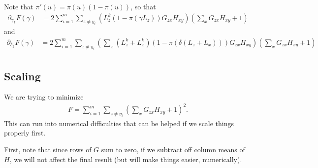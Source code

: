 \documentclass{article}
\begin{document}
Note that $\pi'(u) = \pi(u) (1-\pi(u))$,
so that
\begin{align}
  \partial_{\gamma_k} F(\gamma) &= 2 \sum_{i=1}^m \sum_{z \neq y_i} \left( L^k_z (1-\pi(\gamma L_z)) G_{zx} H_{xy}\right) \left( \sum_x G_{zx} H_{xy} + 1 \right)  
\end{align}
and
\begin{align}
  \partial_{\delta_k} F(\gamma) &= 2 \sum_{i=1}^m \sum_{z \neq y_i} \left( \sum_x (L^k_z + L^k_x) (1-\pi(\delta(L_z+L_x))) G_{zx} H_{xy}\right) \left( \sum_x G_{zx} H_{xy} + 1 \right)  \\
\end{align}


\subsection*{Scaling}

We are trying to minimize
\begin{align}
  F = \sum_{i=1}^m \sum_{z \neq y_i} \left( \sum_x G_{zx} H_{xy} + 1 \right)^2  .
\end{align}
This can run into numerical difficulties that can be helped if we scale things properly first.

First, note that since rows of $G$ sum to zero,
if we subtract off column means of $H$,
we will not affect the final result (but will make things easier, numerically).
\end{document}
